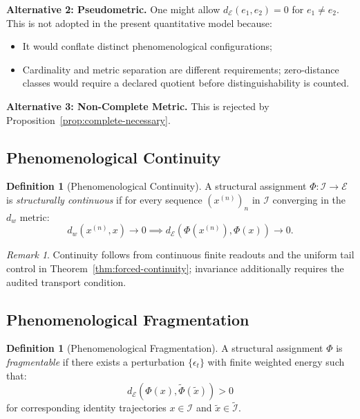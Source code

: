 \documentclass[11pt,a4paper]{article}
\theoremstyle{plain}
\theoremstyle{definition}
\newtheorem{definition}[theorem]{Definition}
\theoremstyle{remark}
\newtheorem{remark}[theorem]{Remark}
\begin{document}
\textbf{Alternative 2: Pseudometric.}
One might allow $d_\mathcal{E}(e_1, e_2) = 0$ for $e_1 \neq e_2$. This is not adopted in the present quantitative model because:
\begin{itemize}[leftmargin=*]
    \item It would conflate distinct phenomenological configurations;
    \item Cardinality and metric separation are different requirements; zero-distance classes would require a declared quotient before distinguishability is counted.
\end{itemize}

\textbf{Alternative 3: Non-Complete Metric.}
This is rejected by Proposition~\ref{prop:complete-necessary}.

\subsection{Phenomenological Continuity}

\begin{definition}[Phenomenological Continuity]\label{def:phen-continuity}
A structural assignment $\Phi: \mathcal{I} \to \mathcal{E}$ is \textit{structurally continuous} if for every sequence $(x^{(n)})_n$ in $\mathcal{I}$ converging in the $d_w$ metric:
\begin{equation}
    d_w(x^{(n)}, x) \to 0 \implies d_\mathcal{E}(\Phi(x^{(n)}), \Phi(x)) \to 0.
\end{equation}
\end{definition}

\begin{remark}
Continuity follows from continuous finite readouts and the uniform tail control in Theorem~\ref{thm:forced-continuity}; invariance additionally requires the audited transport condition.
\end{remark}

\subsection{Phenomenological Fragmentation}

\begin{definition}[Phenomenological Fragmentation]\label{def:fragmentation}
A structural assignment $\Phi$ is \textit{fragmentable} if there exists a perturbation $\{\epsilon_t\}$ with finite weighted energy such that:
\begin{equation}
    d_\mathcal{E}(\Phi(x), \tilde{\Phi}(\tilde{x})) > 0
\end{equation}
for corresponding identity trajectories $x \in \mathcal{I}$ and $\tilde{x} \in \tilde{\mathcal{I}}$.
\end{definition}
\end{document}
